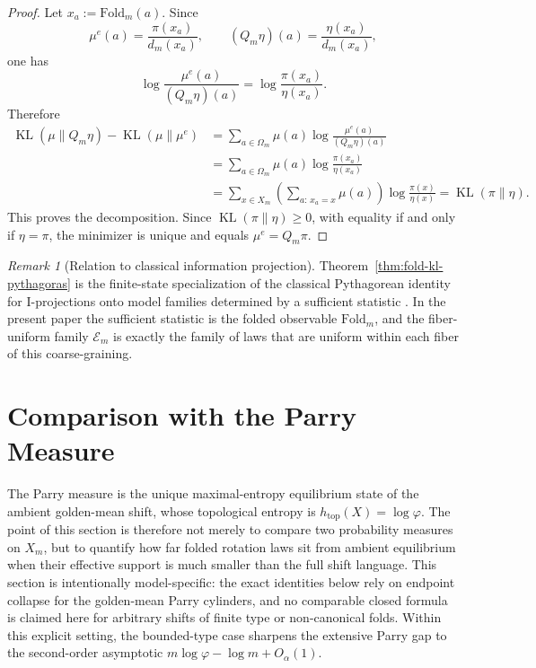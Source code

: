 \documentclass[11pt,letterpaper]{article}
\numberwithin{equation}{section}
\theoremstyle{plain}
\theoremstyle{definition}
\theoremstyle{remark}
\newtheorem{remark}[theorem]{Remark}
\newcommand{\Fold}{\mathrm{Fold}}
\DeclareMathOperator{\KL}{KL}
\begin{document}
\begin{proof}
Let \(x_a:=\Fold_m(a)\). Since
\[
\mu^e(a)=\frac{\pi(x_a)}{d_m(x_a)},
\qquad
(Q_m\eta)(a)=\frac{\eta(x_a)}{d_m(x_a)},
\]
one has
\[
\log\frac{\mu^e(a)}{(Q_m\eta)(a)}=\log\frac{\pi(x_a)}{\eta(x_a)}.
\]
Therefore
\[
\begin{aligned}
\KL(\mu\|Q_m\eta)-\KL(\mu\|\mu^e)
&=
\sum_{a\in\Omega_m}\mu(a)\log\frac{\mu^e(a)}{(Q_m\eta)(a)}\\
&=
\sum_{a\in\Omega_m}\mu(a)\log\frac{\pi(x_a)}{\eta(x_a)}\\
&=
\sum_{x\in X_m}
\left(\sum_{a:\,x_a=x}\mu(a)\right)\log\frac{\pi(x)}{\eta(x)}
=
\KL(\pi\|\eta).
\end{aligned}
\]
This proves the decomposition. Since \(\KL(\pi\|\eta)\ge 0\), with equality if
and only if \(\eta=\pi\), the minimizer is unique and equals \(\mu^e=Q_m\pi\).
\end{proof}

\begin{remark}[Relation to classical information projection]\label{rem:fold-kl-pythagoras-classical}
Theorem~\ref{thm:fold-kl-pythagoras} is the finite-state specialization of the
classical Pythagorean identity for I-projections onto model families determined
by a sufficient statistic \cite{Csiszar1975IdivergenceGeometry}. In the present
paper the sufficient statistic is the folded observable \(\Fold_m\), and the
fiber-uniform family \(\mathcal E_m\) is exactly the family of laws that are
uniform within each fiber of this coarse-graining.
\end{remark}

\section{Comparison with the Parry Measure}

The Parry measure is the unique maximal-entropy equilibrium state of the
ambient golden-mean shift, whose topological entropy is
\(h_{\mathrm{top}}(X)=\log\varphi\). The point of this section is therefore not
merely to compare two probability measures on \(X_m\), but to quantify how far
folded rotation laws sit from ambient equilibrium when their effective support
is much smaller than the full shift language. This section is intentionally
model-specific: the exact identities below rely on endpoint collapse for the
golden-mean Parry cylinders, and no comparable closed formula is claimed here
for arbitrary shifts of finite type or non-canonical folds. Within this explicit
setting, the bounded-type case sharpens the extensive Parry gap to the
second-order asymptotic \(m\log\varphi-\log m+O_\alpha(1)\).
\end{document}
